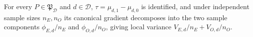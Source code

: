 For every \(P\in\mathfrak P_{\mathcal D}\) and \(d\in\mathcal D\), \(\tau=\mu_{d,1}-\mu_{d,0}\) is identified, and under independent sample sizes \(n_E,n_O\) its canonical gradient decomposes into the two sample components \(\phi_{E,d}/n_E\) and \(\phi_{O,d}/n_O\), giving local variance \(V_{E,d}/n_E+V_{O,d}/n_O\).